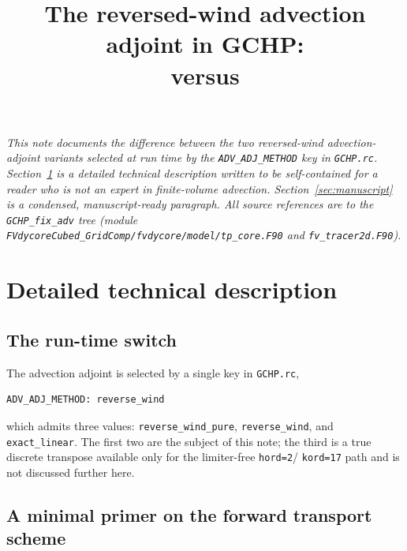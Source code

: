 \documentclass[11pt]{article}
\title{The reversed-wind advection adjoint in GCHP:\\
       \code{reverse\_wind\_pure} versus \code{reverse\_wind}}
\author{}
\date{}
\newcommand{\code}[1]{\texttt{#1}}
\begin{document}
\maketitle

\noindent\emph{This note documents the difference between the two reversed-wind
advection-adjoint variants selected at run time by the \code{ADV\_ADJ\_METHOD}
key in \code{GCHP.rc}. Section~\ref{sec:detailed} is a detailed technical
description written to be self-contained for a reader who is not an expert in
finite-volume advection. Section~\ref{sec:manuscript} is a condensed,
manuscript-ready paragraph. All source references are to the
\code{GCHP\_fix\_adv} tree (module
\code{FVdycoreCubed\_GridComp/fvdycore/model/tp\_core.F90} and
\code{fv\_tracer2d.F90}).}

\section{Detailed technical description}
\label{sec:detailed}

\subsection{The run-time switch}

The advection adjoint is selected by a single key in \code{GCHP.rc},
\begin{lstlisting}
ADV_ADJ_METHOD: reverse_wind
\end{lstlisting}
which admits three values: \code{reverse\_wind\_pure}, \code{reverse\_wind}, and
\code{exact\_linear}. The first two are the subject of this note; the third is a
true discrete transpose available only for the limiter-free \code{hord=2}/
\code{kord=17} path and is not discussed further here.

\subsection{A minimal primer on the forward transport scheme}
\end{document}
